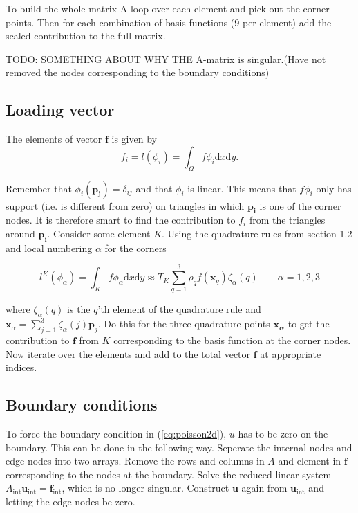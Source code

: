 \documentclass[paper=a4, fontsize=11pt]{scrartcl} %
\begin{document}
To build the whole matrix A loop over each element and pick out the corner points. Then for each combination of basis functions (9 per element) add the scaled contribution to the full matrix.

TODO: SOMETHING ABOUT WHY THE A-matrix is singular.(Have not removed the nodes corresponding to the boundary conditions)
\subsection{Loading vector}
The elements of vector $\mathbf{f}$ is given by
\[ f_i = l(\phi_i) = \int_{\Omega}f\phi_i\mathrm{d}x\mathrm{d}y.\]

Remember that $\phi_i(\mathbf{p_j})=\delta_{ij}$ and that $\phi_i$ is linear. This means that $f\phi_i$ only has support (i.e. is different from zero) on triangles in which $\mathbf{p_i}$ is one of the corner nodes. It is therefore smart to find the contribution to $f_i$ from the triangles around $\mathbf{p_i}$. Consider some element $K$. Using the quadrature-rules from section 1.2 and local numbering $\alpha$ for the corners 

\[ l^{K}(\phi_\alpha) = \int_{K}f\phi_\alpha\mathrm{d}x\mathrm{d}y \approx T_K \sum\limits^{3}_{q=1} \rho_q f(\mathbf{x}_q)\zeta_\alpha(q) \qquad \alpha =1,2,3\]

where $\zeta_\alpha(q)$ is the $q$'th element of the quadrature rule and $\mathbf{x}_\alpha=\sum^3_{j=1}\zeta_\alpha(j)\mathbf{p}_j$. Do this for the three quadrature points $\mathbf{x_\alpha}$ to get the contribution to $\mathbf{f}$ from $K$ corresponding to the basis function at the corner nodes. Now iterate over the elements and add to the total vector $\mathbf{f}$ at appropriate indices.
\subsection{Boundary conditions}
To force the boundary condition in (\ref{eq:poisson2d}), $u$ has to be zero on the boundary. This can be done in the following way. Seperate the internal nodes and edge nodes into two arrays. Remove the rows and columns in $A$ and element in $\mathbf{f}$ corresponding to the nodes at the boundary. Solve the reduced linear system $A_\mathrm{int}\mathbf{u}_\mathrm{int}=\mathbf{f}_\mathrm{int}$, which is no longer singular. Construct $\mathbf{u}$ again from $\mathbf{u}_\mathrm{int}$ and letting the edge nodes be zero.  
\end{document}
